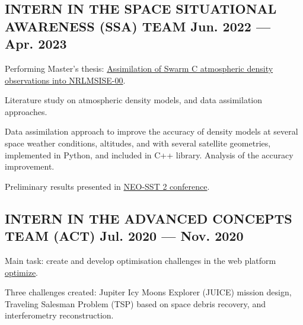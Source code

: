 \documentclass[letter,10pt]{article}
\begin{document}
\subsection{{INTERN IN THE SPACE SITUATIONAL AWARENESS (SSA) TEAM \hfill Jun. 2022  --- Apr. 2023}}
\begin{zitemize}
\item Performing Master's thesis: \href{https://repository.tudelft.nl/islandora/object/uuid:f472201e-0e32-4b9e-8aa3-04521908396a}{Assimilation of Swarm C atmospheric density observations into NRLMSISE-00}.
\begin{zitemize}
    \item Literature study on atmospheric density models, and data assimilation approaches.
    \item Data assimilation approach to improve the accuracy of density models at several space weather conditions, altitudes, and with several satellite geometries, implemented in Python, and included in C++ library. Analysis of the accuracy improvement.
    \item Preliminary results presented in \href{https://conference.sdo.esoc.esa.int/proceedings/neosst2/paper/90/NEOSST2-paper90.pdf}{NEO-SST 2 conference}.
\end{zitemize}
\end{zitemize}
\subsection{{INTERN IN THE ADVANCED CONCEPTS TEAM (ACT) \hfill Jul. 2020  --- Nov. 2020}}
\begin{zitemize}
\item Main task: create and develop optimisation challenges in the web platform \href{https://optimize.esa.int/}{optimize}.
\item Three challenges created: Jupiter Icy Moons Explorer (JUICE) mission design, Traveling Salesman Problem (TSP) based on space debris recovery, and interferometry reconstruction.
\end{zitemize}

\end{document}
